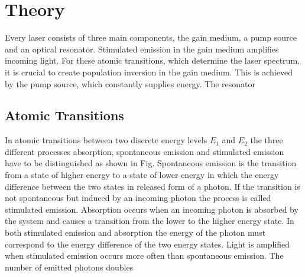 \section{Theory}
Every laser consists of three main components, the gain medium, a pump source
and an optical resonator. 
Stimulated emission in the gain medium amplifies incoming light. For these atomic transitions,
which determine the laser spectrum, it is crucial to create population inversion in the 
gain medium. This is achieved by the pump source, which constantly supplies energy.
The resonator


\subsection*{Atomic Transitions}
In atomic transitions between two discrete energy levels $E_1$ and $E_2$ the three different processes 
absorption, spontaneous emission and stimulated emission have to be distinguished as shown 
in Fig. %
Spontaneous emission is the transition from a state of higher energy to a state of lower 
energy in which the energy difference between the two states in released form of a photon.
If the transition is not spontaneous but induced by an incoming photon the process is 
called stimulated emission. 
Absorption occurs when an incoming photon is absorbed by the system and causes a transition 
from the lower to the higher energy state. 
In both stimulated emission and absorption the energy of the photon must correspond to the energy 
difference of the two energy states.
Light is amplified when stimulated emission occurs more often than spontaneous emission. 
The number of emitted photons doubles